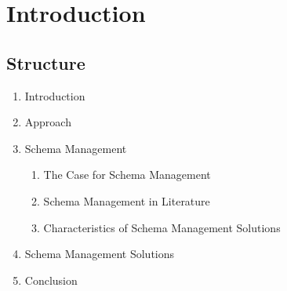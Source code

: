 
\section{Introduction}\label{sec:introduction}

\Blindtext[2]


\subsection{Structure}

\begin{enumerate}
  \item Introduction
  \item Approach
  \item Schema Management
        \begin{enumerate}
          \item The Case for Schema Management
          \item Schema Management in Literature
          \item Characteristics of Schema Management Solutions
        \end{enumerate}
  \item Schema Management Solutions
  \item Conclusion
\end{enumerate}